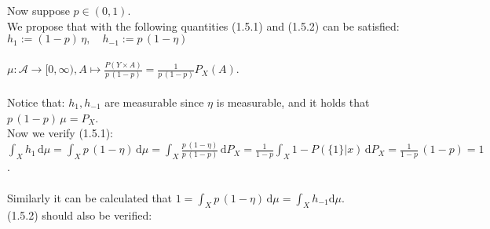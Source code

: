 \documentclass{article}
\begin{document}
Now suppose $p \in (0,1)$. \\
We propose that with the following quantities  (1.5.1) and (1.5.2) can be satisfied: \\
\indent $h_1 := (1-p)\, \eta, \quad h_{-1}:= p\, (1-\eta) \quad $\\
\vspace*{-1em} \\
\indent $\mu : \mathcal{A} \rightarrow [0,\infty) , A \mapsto \displaystyle{ \frac{P(Y\times A)}{p\, (1-p)} = \frac{1}{p\, (1-p)} P_X(A) }$.\\
\vspace*{-1.3em} \\
Notice that:  $h_1, h_{-1}$ are measurable since $\eta$ is measurable, and it holds that $p\, (1-p)\, \mu = P_X$. \\
Now we verify (1.5.1): \\
\indent $\displaystyle{ \int_X h_1 \, \text{d}\mu = \int_X p\, (1-\eta) \, \text{d}\mu = \int_X \frac{p\, (1-\eta)}{p\, (1-p)} \, \text{d}P_X = \frac{1}{1-p}\int_X 1-P(\{1\}|x)\, \text{d}P_X = \frac{1}{1-p} \,(1-p) = 1 }$.\\
\vspace*{-0.5em} \\
Similarly it can be calculated that $ \displaystyle{  1 = \int_X p\, (1-\eta)\,\text{d} \mu = \int_X h_{-1} \text{d} \mu }$.\vspace*{0.6em}\\
(1.5.2) should also be verified\vspace*{-0.3em}: 
\end{document}
